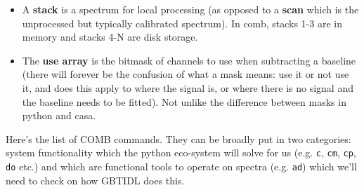 \documentclass[12pt,a4paper]{article}
\begin{document}
\begin{itemize}
  
\item A {\bf stack} is a spectrum for local processing (as opposed to a
  {\bf scan} which is the unprocessed but typically calibrated spectrum).
  In comb, stacks 1-3 are in memory and stacks 4-N are disk storage.
  
\item  
  The {\bf use array} is the bitmask of channels to use when subtracting a
  baseline (there will forever be the confusion of what a mask means: use it
  or not use it, and does this apply to where the signal is, or where there
  is no signal and the baseline needs to be fitted). Not unlike the difference
  between masks in python and casa.
  
\end{itemize}

Here's the list of COMB commands.  They can be broadly put in two categories:
system functionality which the python eco-system will solve for us (e.g. {\tt c},
{\tt cm}, {\tt cp}, {\tt do} etc.) and which are functional tools to operate
on spectra (e.g. {\tt ad}) which we'll need to check on how GBTIDL does this.
\end{document}
